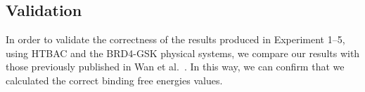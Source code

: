 


\subsection{Validation}

In order to validate the correctness of the results produced in Experiment
1--5, using HTBAC and the BRD4-GSK physical systems, we compare our results
with those previously published in Wan et al.~\cite{Wan2017brd4}. In this
way, we can confirm that we calculated the correct binding free energies
values.

